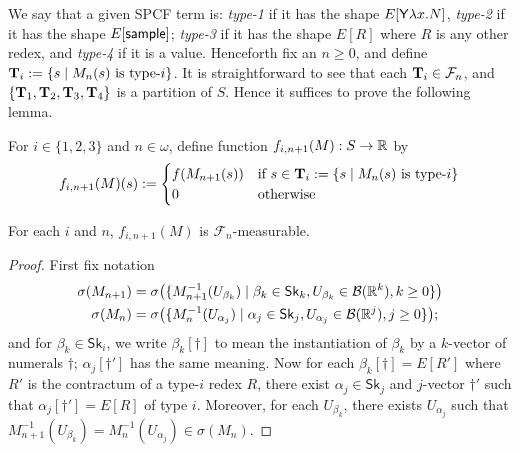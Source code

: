 \iffalse
\lo{We need to show that each $f(M_n)$ is integrable. LO claimed earlier that $0 \leq f(N) \leq f(M)$ for all $N \in \mathit{Rch}(M)$.
This is of false: take $f$ with $v \, \tsample \mapsto 1$ and $v \, \underline{r} \mapsto 2\, r$ for some value $v$. 
However, it is true that
\[
\int_{S} \mu(\dif s) \, |f(M_n)(s)| 
=
\int_{S} \mu(\dif s) \, f(M_n)(s)
\leq
\int_{S} \mu(\dif s) \, f(M_0)(s)
=
f(M)
\]
the inequality above follows from \Cref{lem:key rankable}.
}
\fi

We say that a given SPCF term is: %
\emph{type-1} if it has the shape $E[\mathsf{Y} \lambda x. N]$, \emph{type-2} if it has the shape $E[\mathsf{sample}]$; \emph{type-3} if it has the shape $E[R]$ where $R$ is any other redex, and \emph{type-4} if it is a value.
Henceforth fix an $n \geq 0$, and define $\mathbf{T}_i := \{s \mid M_n(s) \hbox{ is type-$i$}\}$.
It is straightforward to see that each $\mathbf{T}_i \in \mathcal{F}_n$, and $\{\mathbf{T}_1, \mathbf{T}_2, \mathbf{T}_3, \mathbf{T}_4\}$ is a partition of $S$.
Hence it suffices to prove the following lemma.

\iffalse
For $i \in \{1, 2, 3\}$ and $n \in \omega$, define function $f_{i, n+1}(M) : S \to \mathbb{R}$ by
\[
f_{i, n+1}(M)(s) :=
\begin{cases}
f(M_{n+1}(s)) & \hbox{if }s \in \mathbf{T}_i := 
\{s \mid M_n(s) \textrm{ is type-$i$}\}\\
0 & \textrm{otherwise}
\end{cases}
\]
\begin{lemma}
\label{lem:inde}
For each $i$ and $n$, $f_{i, n+1}(M)$ is %
$\mathcal{F}_{n}$-measurable.
\end{lemma}

\begin{proof} First fix notation
\begin{align*}
\sigma(M_{n+1}) &= \sigma\big(\{M_{n+1}^{-1}(U_{\beta_k})
\mid \beta_k\in \mathsf{Sk}_k, U_{\beta_k} \in \mathcal{B}(\mathbb{R}^k), k \geq 0\}\big)\\
\sigma(M_{n}) &= \sigma\big(\{M_{n}^{-1}(U_{\alpha_j})
\mid \alpha_j\in \mathsf{Sk}_j, U_{\alpha_j} \in \mathcal{B}(\mathbb{R}^j), j \geq 0\}\big);
\end{align*}
and for $\beta_k \in \mathsf{Sk}_i$, we write $\beta_k[\dagger]$ to mean the instantiation of $\beta_k$ by a $k$-vector of numerals $\dagger$; $\alpha_j[\dagger']$ has the same meaning.
Now for each $\beta_k[\dagger] = E[R']$ where $R'$ is the contractum of a type-$i$ redex $R$, there exist $\alpha_j \in \mathsf{Sk}_j$ and $j$-vector $\dagger'$ such that $\alpha_j[\dagger'] = E[R]$ of type $i$.
Moreover, for each $U_{\beta_k}$, there exists $U_{\alpha_j}$ such that $M_{n+1}^{-1}(U_{\beta_k}) = M_{n}^{-1}(U_{\alpha_j}) \in \sigma(M_n)$.
\end{proof}

